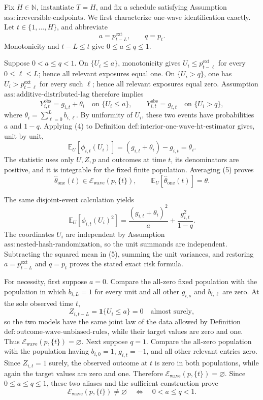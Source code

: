 Fix \(H\in\mathbb N\), instantiate \(T=H\), and fix a schedule satisfying Assumption \(\mathrm{ass:irreversible\text{-}endpoints}\).  We first characterize one-wave identification exactly.  Let \(t\in\{1,\ldots,H\}\), and abbreviate
\[
 a=p^{\mathrm{ext}}_{t-L},\qquad q=p_t.
\]
Monotonicity and \(t-L\leq t\) give \(0\leq a\leq q\leq1\).

Suppose \(0<a\leq q<1\).  On \(\{U_i\leq a\}\), monotonicity gives \(U_i\leq p^{\mathrm{ext}}_{t-\ell}\) for every \(0\leq\ell\leq L\); hence all relevant exposures equal one.  On \(\{U_i>q\}\), one has \(U_i>p^{\mathrm{ext}}_{t-\ell}\) for every such \(\ell\); hence all relevant exposures equal zero.  Assumption \(\mathrm{ass:additive\text{-}distributed\text{-}lag}\) therefore implies
\[
 Y^{\mathrm{obs}}_{i,t}=g_{i,t}+\theta_i
 \quad\text{on }\{U_i\leq a\},
 \qquad
 Y^{\mathrm{obs}}_{i,t}=g_{i,t}
 \quad\text{on }\{U_i>q\},
 \tag{4}
\]
where \(\theta_i=\sum_{\ell=0}^{L}b_{i,\ell}\).  By uniformity of \(U_i\), these two events have probabilities \(a\) and \(1-q\).  Applying (4) to Definition \(\mathrm{def:interior\text{-}one\text{-}wave\text{-}ht\text{-}estimator}\) gives, unit by unit,
\[
 \mathbb E_U[\phi_{i,t}(U_i)]
 =(g_{i,t}+\theta_i)-g_{i,t}=\theta_i.
 \tag{5}
\]
The statistic uses only \(U,Z,p\) and outcomes at time \(t\), its denominators are positive, and it is integrable for the fixed finite population.  Averaging (5) proves
\[
 \widehat\theta_{\mathrm{one}}(t)
 \in\mathcal E_{\mathrm{wave}}(p,\{t\}),
 \qquad
 \mathbb E_U[\widehat\theta_{\mathrm{one}}(t)]=\theta.
\]

The same disjoint-event calculation yields
\[
 \mathbb E_U[\phi_{i,t}(U_i)^2]
 =\frac{(g_{i,t}+\theta_i)^2}{a}
  +\frac{g_{i,t}^2}{1-q}.
\]
The coordinates \(U_i\) are independent by Assumption \(\mathrm{ass:nested\text{-}hash\text{-}randomization}\), so the unit summands are independent.  Subtracting the squared mean in (5), summing the unit variances, and restoring \(a=p^{\mathrm{ext}}_{t-L}\) and \(q=p_t\) proves the stated exact risk formula.

For necessity, first suppose \(a=0\).  Compare the all-zero fixed population with the population in which \(b_{i,L}=1\) for every unit and all other \(g_{i,s}\) and \(b_{i,\ell}\) are zero.  At the sole observed time \(t\),
\[
 Z_{i,t-L}=\mathbf 1\{U_i\leq a\}=0
 \quad\text{almost surely},
\]
so the two models have the same joint law of the data allowed by Definition \(\mathrm{def:outcome\text{-}wave\text{-}unbiased\text{-}rules}\), while their target values are zero and one.  Thus \(\mathcal E_{\mathrm{wave}}(p,\{t\})=\varnothing\).  Next suppose \(q=1\).  Compare the all-zero population with the population having \(b_{i,0}=1\), \(g_{i,t}=-1\), and all other relevant entries zero.  Since \(Z_{i,t}=1\) surely, the observed outcome at \(t\) is zero in both populations, while again the target values are zero and one.  Therefore \(\mathcal E_{\mathrm{wave}}(p,\{t\})=\varnothing\).  Since \(0\leq a\leq q\leq1\), these two aliases and the sufficient construction prove
\[
 \mathcal E_{\mathrm{wave}}(p,\{t\})\ne\varnothing
 \quad\Longleftrightarrow\quad 0<a\leq q<1.
 \tag{6}
\]


